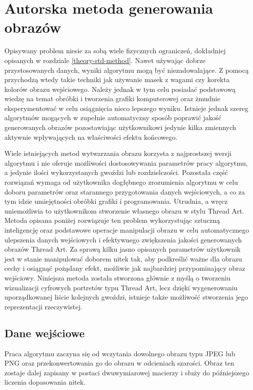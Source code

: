         
\chapter{Autorska metoda generowania obrazów} \label{mine}
Opisywany problem niesie za sobą wiele fizycznych ograniczeń, dokładniej opisanych w rozdziale \ref{theory-std-method}. Nawet używając dobrze przystosowanych danych, wyniki algorytmu mogą być niezadowalające. Z pomocą przychodzą wtedy takie techniki jak używanie masek z wagami czy korekta kolorów obrazu wejściowego. Należy jednak w tym celu posiadać podstawową wiedzę na temat obróbki i tworzenia grafiki komputerowej oraz żmudnie eksperymentować w celu osiągnięcia nieco lepszego wyniku. Istnieje jednak szereg algorytmów mogących w zupełnie automatyczny sposób poprawić jakość generowanych obrazów pozostawiając użytkownikowi jedynie kilka zmiennych aktywnie wpływających na właściwości efektu końcowego. 

Wiele istniejących metod wytwarzania obrazu korzysta z najprostszej wersji algorytmu i nie oferuje możliwości dostosowywania parametrów pracy algorytmu, a jedynie ilości wykorzystanych gwoździ lub rozdzielczości. Pozostała część rozwiązań wymaga od użytkownika dogłębnego zrozumienia algorytmu w celu doboru parametrów oraz starannego przygotowania danych wejściowych, a co za tym idzie umiejętności obróbki grafiki i programowania. Utrudnia, a wręcz uniemożliwia to użytkownikom stworzenie własnego obrazu w stylu Thread Art. Metoda opisana poniżej rozwiązuje ten problem wykorzystując sztuczną inteligencję oraz podstawowe operacje manipulacji obrazu w celu automatycznego ulepszenia danych wejściowych i efektywnego zwiększenia jakości generowanych obrazów Thread Art. Za sprawą kilku jasno opisanych parametrów użytkownik jest w stanie manipulować doborem nitek tak, aby podkreślić ważne dla obrazu cechy i osiągnąć pożądany efekt, możliwie jak najbardziej przypominający obraz wejściowy. Niniejsza metoda została stworzona głównie z myślą o tworzeniu wizualizacji cyfrowych portretów typu Thread Art, lecz dzięki wygenerowaniu uporządkowanej liście kolejnych gwoździ, istnieje także możliwość stworzenia jego reprezentacji rzeczywistej. 

    \section{Dane wejściowe} \label{mine-input}
    Praca algorytmu zaczyna się od wczytania dowolnego obrazu typu JPEG lub PNG oraz przekonwertowania go do obrazu w odcieniach szarości. Obraz ten zostaje dalej zapisany w postaci dwuwymiarowej macierzy i służy do późniejszego liczenia dopasowania nitek.
    
